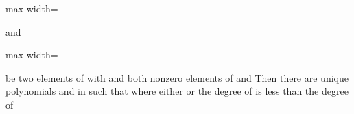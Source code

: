 \documentclass[11pt,oneside]{article}
\begin{document}
\begin{BookBody}


\begin{center}\begin{adjustbox}{max width=\linewidth}\end{adjustbox}\end{center}

\noindent and

\begin{center}\begin{adjustbox}{max width=\linewidth}\end{adjustbox}\end{center}

\noindent be two elements of  with  and  both nonzero elements of  and  Then there are unique polynomials  and  in  such that  where either  or the degree of  is less than the degree  of 

\end{BookBody}

\BookNarrativetrue
\end{document}
